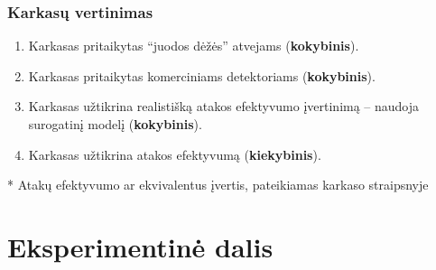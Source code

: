 \begin{frame}
    \frametitle{Karkasų vertinimas}
    \begin{enumerate}[K-1.]
        \item Karkasas pritaikytas \enquote{juodos dėžės} atvejams
              (\textbf{kokybinis}).\pause
        \item Karkasas pritaikytas komerciniams detektoriams (\textbf{kokybinis}).\pause
        \item Karkasas užtikrina realistišką atakos efektyvumo įvertinimą -- naudoja
              surogatinį modelį (\textbf{kokybinis}).\pause
        \item Karkasas užtikrina atakos efektyvumą (\textbf{kiekybinis}).
    \end{enumerate}\pause

    \begin{criteriaTable}
    \end{criteriaTable}
    \footnotesize{* Atakų efektyvumo ar ekvivalentus įvertis, pateikiamas karkaso straipsnyje}

\end{frame}

\section{Eksperimentinė dalis}

